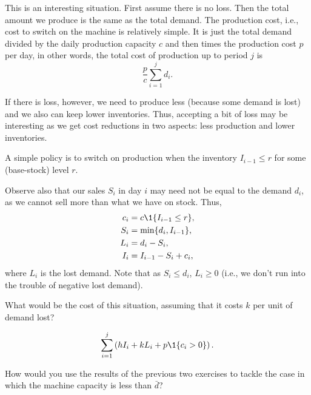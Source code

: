   \begin{solution}
    This is an interesting situation. First assume there is no
    loss. Then the total amount we produce is the same as the total
    demand. The production cost, i.e., cost to switch on the machine
    is relatively simple. It is just the total demand divided by the
    daily production capacity $c$ and then times the production cost
    $p$ per day, in other words, the total cost of production up to period $j$ is
    \begin{equation*}
    \frac{p}c\sum_{i=1}^j d_i.
    \end{equation*}

    If there is loss, however, we need to produce less (because some
    demand is lost) and we also can keep lower inventories. Thus,
    accepting a bit of loss may be interesting as we get cost
    reductions in two aspects: less production and lower inventories.

    A simple policy is to switch on production when the inventory
    $I_{i-1}\leq r$ for some (base-stock) level $r$. 

Observe also that our sales $S_i$ in day $i$ may need not be equal to the demand $d_i$,  as we cannot sell more than what we have on stock. Thus,
    \begin{align*}
      c_i &= c \1{I_{i-1} \leq r}, \\
      S_i &= \min\{d_i, I_{i-1}\}, \\
      L_i &= d_i - S_i, \\
      I_i &= I_{i-1} -S_i + c_i, 
    \end{align*}
    where $L_i$ is the lost demand. Note that as $S_i \leq d_i$,
    $L_i \geq 0$ (i.e., we don't run into the trouble of negative lost
    demand).
  \end{solution}


\begin{question}
  What would be the cost of this situation, assuming that it costs $k$
  per unit of demand lost? 
\end{question}

\begin{solution}
  \begin{equation*}
    \sum_{i=1}^j \left(h I_{i} + k L_i + p\1{c_i>0}\right).
  \end{equation*}
\end{solution}


\begin{question}
  How would you use the results of the previous two exercises to tackle the case in which the machine capacity is less than $\bar d$?
\end{question}

